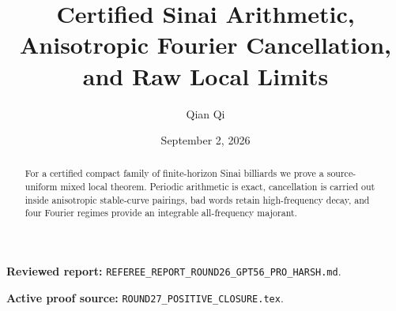 \documentclass[11pt,reqno]{amsart}
\title[A2 Round 27 revision]{Certified Sinai Arithmetic, Anisotropic Fourier Cancellation, and Raw Local Limits}
\author{Qian Qi}
\date{September 2, 2026}
\begin{document}
\begin{abstract}For a certified compact family of finite-horizon Sinai billiards we prove a source-uniform mixed local theorem. Periodic arithmetic is exact, cancellation is carried out inside anisotropic stable-curve pairings, bad words retain high-frequency decay, and four Fourier regimes provide an integrable all-frequency majorant.\end{abstract}
\maketitle
\noindent\textbf{Reviewed report:} \texttt{REFEREE\_REPORT\_ROUND26\_GPT56\_PRO\_HARSH.md}.\par
\noindent\textbf{Active proof source:} \texttt{ROUND27\_POSITIVE\_CLOSURE.tex}.\par

\end{document}
